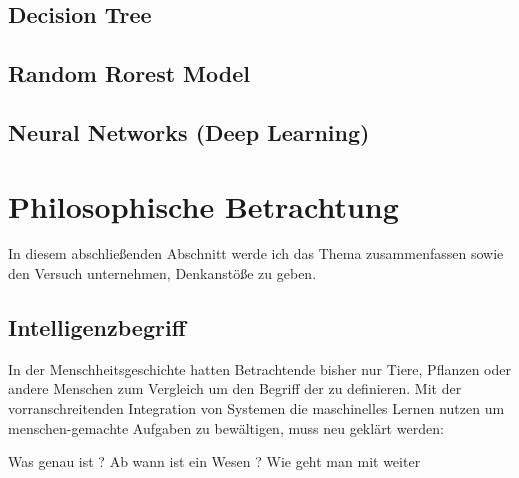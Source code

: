 \documentclass[12pt]{report}
\begin{document}
    \subsection{Decision Tree}
    \subsection{Random Rorest Model}
    \subsection{Neural Networks (Deep Learning)}
    \section{Philosophische Betrachtung}
    In diesem abschließenden Abschnitt werde ich das Thema zusammenfassen sowie den Versuch unternehmen,
    Denkanstöße zu geben.
    \subsection{Intelligenzbegriff}
    In der Menschheitsgeschichte hatten Betrachtende bisher nur Tiere, Pflanzen oder andere Menschen zum Vergleich
    um den Begriff der  zu definieren. Mit der vorranschreitenden Integration von Systemen die maschinelles
    Lernen nutzen um menschen-gemachte Aufgaben zu bewältigen, muss neu geklärt werden:
        \begin{displayquote}
            Was genau ist ?
            Ab wann ist ein Wesen ?
            Wie geht man mit weiter
        \end{displayquote}

    \printbibliography
\end{document}
